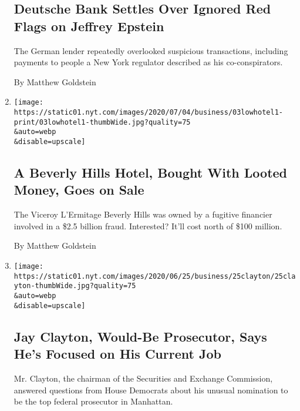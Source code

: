 \begin{enumerate}
  \hypertarget{deutsche-bank-settles-over-ignored-red-flags-on-jeffrey-epstein}{%
  \subsection{Deutsche Bank Settles Over Ignored Red Flags on Jeffrey
  Epstein}\label{deutsche-bank-settles-over-ignored-red-flags-on-jeffrey-epstein}}

  The German lender repeatedly overlooked suspicious transactions,
  including payments to people a New York regulator described as his
  co-conspirators.

  By Matthew Goldstein
\item
  \href{/2020/07/03/business/viceroy-beverly-hills-1MDB-fraud.html}{}

  \texttt{[image: https://static01.nyt.com/images/2020/07/04/business/03lowhotel1-print/03lowhotel1-thumbWide.jpg?quality=75\\\&auto=webp\\\&disable=upscale]}

  \hypertarget{a-beverly-hills-hotel-bought-with-looted-money-goes-on-sale}{%
  \subsection{A Beverly Hills Hotel, Bought With Looted Money, Goes on
  Sale}\label{a-beverly-hills-hotel-bought-with-looted-money-goes-on-sale}}

  The Viceroy L'Ermitage Beverly Hills was owned by a fugitive financier
  involved in a \$2.5 billion fraud. Interested? It'll cost north of
  \$100 million.

  By Matthew Goldstein
\item
  \href{/2020/06/25/business/jay-clayton-sec-sdny.html}{}

  \texttt{[image: https://static01.nyt.com/images/2020/06/25/business/25clayton/25clayton-thumbWide.jpg?quality=75\\\&auto=webp\\\&disable=upscale]}

  \hypertarget{jay-clayton-would-be-prosecutor-says-hes-focused-on-his-current-job}{%
  \subsection{Jay Clayton, Would-Be Prosecutor, Says He's Focused on His
  Current
  Job}\label{jay-clayton-would-be-prosecutor-says-hes-focused-on-his-current-job}}

  Mr. Clayton, the chairman of the Securities and Exchange Commission,
  answered questions from House Democrats about his unusual nomination
  to be the top federal prosecutor in Manhattan.


\end{enumerate}
